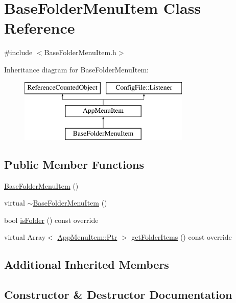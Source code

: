 \hypertarget{classBaseFolderMenuItem}{}\section{Base\+Folder\+Menu\+Item Class Reference}
\label{classBaseFolderMenuItem}


{\ttfamily \#include $<$Base\+Folder\+Menu\+Item.\+h$>$}

Inheritance diagram for Base\+Folder\+Menu\+Item\+:\begin{figure}[H]
\begin{center}
\leavevmode
\includegraphics[height=3.000000cm]{classBaseFolderMenuItem}
\end{center}
\end{figure}
\subsection*{Public Member Functions}
\begin{DoxyCompactItemize}
\item 
\mbox{\hyperlink{classBaseFolderMenuItem_a4f095e1f5b230c72436cda3e229e81fe}{Base\+Folder\+Menu\+Item}} ()
\item 
virtual \mbox{\hyperlink{classBaseFolderMenuItem_ad1eab257ee453b537644fb3b1478a6cd}{$\sim$\+Base\+Folder\+Menu\+Item}} ()
\item 
bool \mbox{\hyperlink{classBaseFolderMenuItem_abde18847e5e1c7c06c23d8e947bfdcc6}{is\+Folder}} () const override
\item 
virtual Array$<$ \mbox{\hyperlink{classAppMenuItem_ab5f51c5d74f8df62b8862c0cc8126cb7}{App\+Menu\+Item\+::\+Ptr}} $>$ \mbox{\hyperlink{classBaseFolderMenuItem_aeb33a4ceb17469daa82de80a44a2e862}{get\+Folder\+Items}} () const override
\end{DoxyCompactItemize}
\subsection*{Additional Inherited Members}


\subsection{Constructor \& Destructor Documentation}
\mbox{\label{classBaseFolderMenuItem_a4f095e1f5b230c72436cda3e229e81fe}} 
